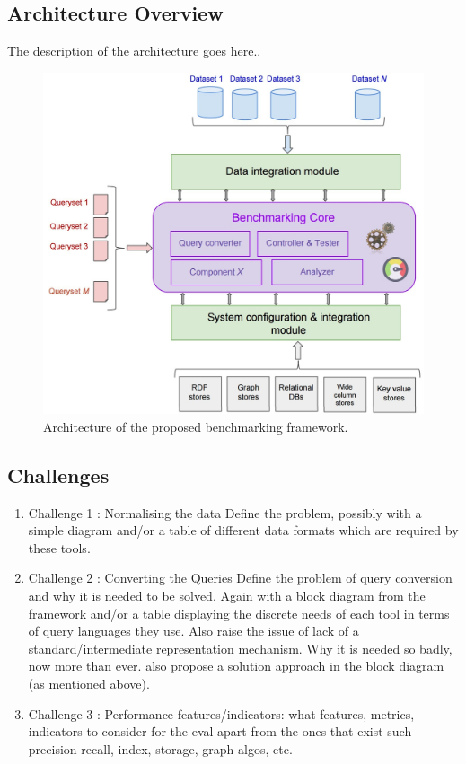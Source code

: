 \documentclass{llncs}
\newcommand{\todoinline}[1]{
    \todo[inline]{#1}
}
\begin{document}
    

    \subsection{Architecture Overview}
        The description of the architecture goes here.. 
        \begin{figure}[t]
            \centering
            \includegraphics[width=\textwidth]{images/benchmark_arch_new}
            \caption{Architecture of the proposed benchmarking framework.}
            \label{fig:benchmark_arch}
        \end{figure}
    
    \subsection{Challenges}
    \todoinline{pending}
        \begin{enumerate}
            \item Challenge 1 : Normalising the data
            Define the problem, possibly with a simple diagram and/or a table of different data formats which are required by these tools.
            \item Challenge 2 : Converting the Queries
            Define the problem of query conversion and why it is needed to be solved. Again with a block diagram from the framework and/or a table displaying the discrete needs of each tool in terms of query languages they use.
            Also raise the issue of lack of a standard/intermediate representation mechanism. Why it is needed so badly, now more than ever.
            also propose a solution approach in the block diagram (as mentioned above).
            \item Challenge 3 : Performance features/indicators: what features, metrics, indicators to consider for the eval apart from the ones that exist such precision recall, index, storage, graph algos, etc.
        \end{enumerate}
        
\end{document}
